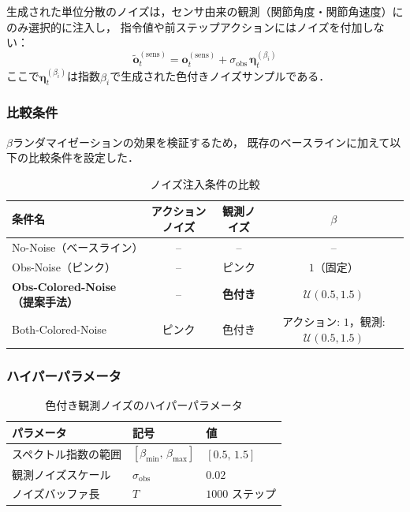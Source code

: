 生成された単位分散のノイズは，センサ由来の観測（関節角度・関節角速度）にのみ選択的に注入し，
指令値や前ステップアクションにはノイズを付加しない：
\begin{equation}
  \tilde{\boldsymbol{o}}_t^{(\mathrm{sens})} = \boldsymbol{o}_t^{(\mathrm{sens})} + \sigma_{\mathrm{obs}} \, \boldsymbol{\eta}_t^{(\beta_i)}
  \label{eq:corruption}
\end{equation}
ここで$\boldsymbol{\eta}_t^{(\beta_i)}$は指数$\beta_i$で生成された色付きノイズサンプルである．

\subsubsection{比較条件}

$\beta$ランダマイゼーションの効果を検証するため，
既存のベースラインに加えて以下の比較条件を設定した．

\begin{table}[htbp]
  \centering
  \caption{ノイズ注入条件の比較}
  \label{tab:colored_scenarios}
  \begin{tabular}{lccc}
    \toprule
    条件名 & アクションノイズ & 観測ノイズ & $\beta$ \\
    \midrule
    No-Noise（ベースライン） & -- & -- & -- \\
    Obs-Noise（ピンク） & -- & ピンク & $1$（固定） \\
    \textbf{Obs-Colored-Noise（提案手法）} & -- & \textbf{色付き} & $\boldsymbol{\mathcal{U}(0.5, 1.5)}$ \\
    Both-Colored-Noise & ピンク & 色付き & アクション: $1$，観測: $\mathcal{U}(0.5, 1.5)$ \\
    \bottomrule
  \end{tabular}
\end{table}

\subsubsection{ハイパーパラメータ}

\begin{table}[htbp]
  \centering
  \caption{色付き観測ノイズのハイパーパラメータ}
  \label{tab:colored_hyperparams}
  \begin{tabular}{lll}
    \toprule
    パラメータ & 記号 & 値 \\
    \midrule
    スペクトル指数の範囲 & $[\beta_{\min},\, \beta_{\max}]$ & $[0.5,\, 1.5]$ \\
    観測ノイズスケール & $\sigma_{\mathrm{obs}}$ & $0.02$ \\
    ノイズバッファ長 & $T$ & $1000$ ステップ \\
    \bottomrule
  \end{tabular}
\end{table}

